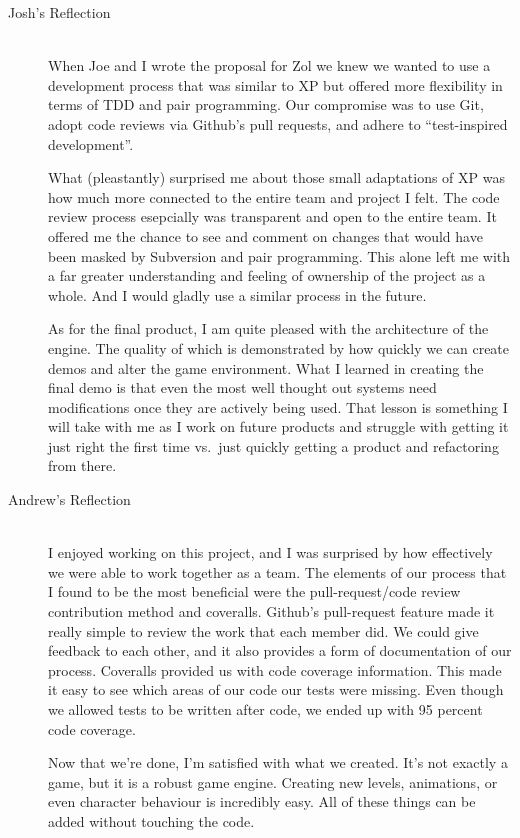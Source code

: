 \documentclass{article}
\begin{document}
		\begin{description}
			\item[Josh's Reflection] \hfill \\
			When Joe and I wrote the proposal for Zol we knew we wanted to
			use a development process that was similar to XP but offered more
			flexibility in terms of TDD and pair programming. Our compromise
			was to use Git, adopt code reviews via Github's pull requests,
			and adhere to ``test-inspired development''.

			What (pleastantly) surprised me about those small adaptations of
			XP was how much more connected to the entire team and project I
			felt. The code review process esepcially was transparent and
			open to the entire team. It offered me the chance to see and
			comment on changes that would have been masked by Subversion and
			pair programming. This alone left me with a far greater
			understanding and feeling of ownership of the project as a whole.
			And I would gladly use a similar process in the future.

			As for the final product, I am quite pleased with the architecture
			of the engine. The quality of which is demonstrated by how
			quickly we can create demos and alter the game environment. What
			I learned in creating the final demo is that even the most well
			thought out systems need modifications once they are actively
			being used. That lesson is something I will take with me as
			I work on future products and struggle with getting it just right
			the first time vs.\ just quickly getting a product and refactoring
			from there.

			\item[Andrew's Reflection] \hfill \\
			I enjoyed working on this project, and I was surprised by how effectively 
			we were able to work together as a team. The elements of our process that 
			I found to be the most beneficial were the pull-request/code review 
			contribution method and coveralls. Github's pull-request feature made it 
			really simple to review the work that each member did. We could give feedback 
			to each other, and it also provides a form of documentation of our process. 
			Coveralls provided us with code coverage information. This made it easy to 
			see which areas of our code our tests were missing. Even though we allowed 
			tests to be written after code, we ended up with 95 percent code coverage.

			Now that we're done, I'm satisfied with what we created. It's not exactly a 
			game, but it is a robust game engine. Creating new levels, animations, or 
			even character behaviour is incredibly easy. All of these things can be 
			added without touching the code. 


\end{description}
\end{document}
